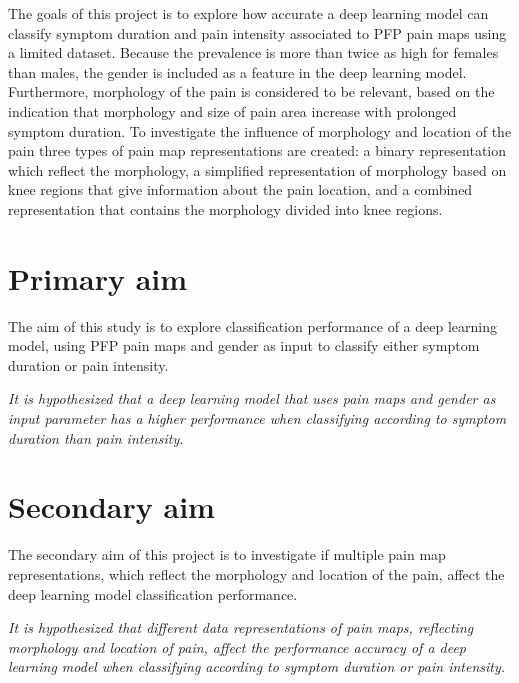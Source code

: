 \noindent
The goals of this project is to explore how accurate a deep learning model can classify symptom duration and pain intensity associated to PFP pain maps using a limited dataset. Because the prevalence is more than twice as high for females than males, the gender is included as a feature in the deep learning model. 
Furthermore, morphology of the pain is considered to be relevant, based on the indication that morphology and size of pain area increase with prolonged symptom duration. 
To investigate the influence of morphology and location of the pain three types of pain map representations are created: a binary representation which reflect the morphology, a simplified representation of morphology based on knee regions that give information about the pain location, and a combined representation that contains the morphology divided into knee regions.   

\section{Primary aim}
The aim of this study is to explore classification performance of a deep learning model, using PFP pain maps and gender as input to classify either symptom duration or pain intensity. 
\vspace{4mm}
\noindent
\begin{center}
\textit{It is hypothesized that a deep learning model that uses pain maps and gender as input parameter has a higher performance when classifying according to symptom duration than pain intensity.}
\end{center}

\section{Secondary aim}
The secondary aim of this project is to investigate if multiple pain map representations, which reflect the morphology and location of the pain, affect the deep learning model classification performance.

\vspace{4mm}
\noindent
\begin{center}
\textit{It is hypothesized that different data representations of pain maps, reflecting morphology and location of pain, affect the performance
accuracy of a deep learning model when classifying according to symptom duration or pain intensity.
}
\end{center}

